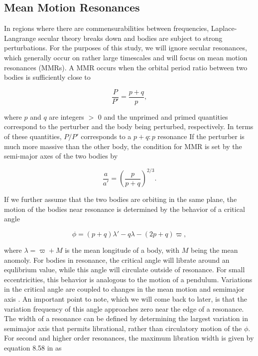\documentclass[twocolumn]{aastex63}
\begin{document}
\subsection{Mean Motion Resonances}

In regions where there are commensurabilities between frequencies, Laplace-Langrange secular theory breaks down and bodies are subject to strong 
perturbations. For the purposes of this study, we will ignore secular resonances, which generally occur on rather large timescales and will focus on 
mean motion resonances (MMRs). A MMR occurs  when the orbital period ratio between two bodies is sufficiently close to

\begin{equation}\label{eq:per_mmr}
	\frac{P}{P'} = \frac{p + q}{p},
\end{equation}

\noindent where  $p$ and $q$ are integers $>$ 0 and the unprimed and primed quantities correspond to the perturber and the body being perturbed, respectively. In terms of these quantities, $P/P'$ corresponds to a $p+q:p$ resonance If the perturber is much more massive than the other body, the condition for MMR is set  by the semi-major axes of the two bodies by

\begin{equation}\label{eq:a_mmr}
	\frac{a}{a'} = \left( \frac{p}{p + q} \right)^{2/3}.
\end{equation}

If we further assume that the two bodies are orbiting in the same plane, the motion of the bodies near resonance is determined by the
behavior of a critical angle

\begin{equation}\label{eq:phi_crit}
	\phi = (p + q) \lambda' - q \lambda - (2 p + q) \varpi,
\end{equation}

\noindent where $\lambda = \varpi + M$ is the mean longitude of a
body, with $M$ being the mean anomoly. For bodies in resonance, the critical angle will librate around an 
equlibrium value, while this angle will circulate outside of resonance. For small eccentricities, this behavior is analogous to the motion of a 
pendulum. Variations in the critical angle are coupled to changes in the mean motion and semimajor axis \citep{2000ssd..book.....M}. An important 
point to note, which we will come back to later, is that the variation frequency of this angle approaches zero near the edge of a resonance. The 
width of a resonance can be defined by determining the largest variation in semimajor axis that permits librational, rather than circulatory motion of 
the $\phi$. For second and higher order resonances, the maximum libration width is given by equation 8.58 in \citet{2000ssd..book.....M} as
\end{document}
